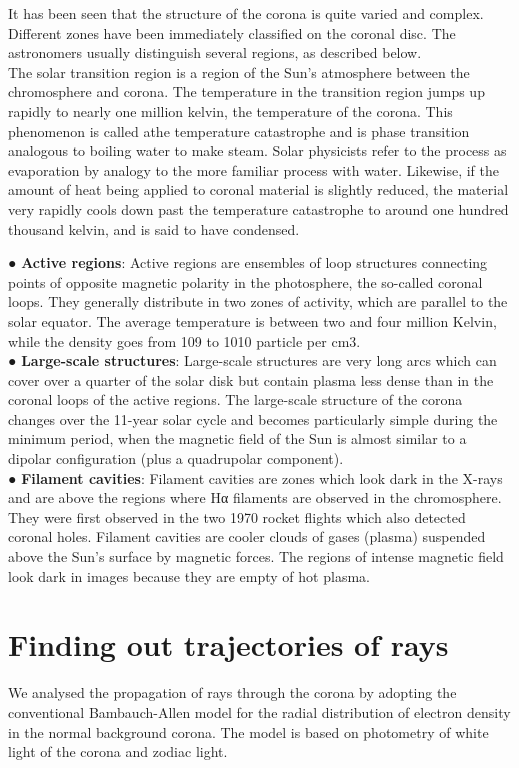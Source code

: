 \documentclass[journal]{IEEEtran}
\begin{document}
It has been seen that the structure of the corona is quite varied and complex. Different
zones have been immediately classified on the coronal disc. The astronomers usually
distinguish several regions, as described below.\\

The solar transition region is a region of the Sun's atmosphere between the chromosphere and corona. The temperature in the transition region jumps up rapidly to nearly one million kelvin, the temperature of the corona. This phenomenon is called athe temperature catastrophe and is phase transition analogous to boiling water to make steam. Solar physicists refer to the process as evaporation by analogy to the more familiar process with water. Likewise, if the amount of heat being applied to coronal material is slightly reduced, the material very rapidly cools down past the temperature catastrophe to around one hundred thousand kelvin, and is said to have condensed. 

● \textbf{Active regions}: ​Active regions are ensembles of loop structures connecting
points of opposite magnetic polarity in the photosphere, the so-called coronal
loops. They generally distribute in two zones of activity, which are parallel to the
solar equator. The average temperature is between two and four million Kelvin,
while the density goes from 109 to 1010 particle per cm3.\\
● \textbf{Large-scale structures}:​ Large-scale structures are very long arcs which can
cover over a quarter of the solar disk but contain plasma less dense than in the
coronal loops of the active regions. The large-scale structure of the corona
changes over the 11-year solar cycle and becomes particularly simple during the
minimum period, when the magnetic field of the Sun is almost similar to a dipolar
configuration (plus a quadrupolar component).\\
● \textbf{Filament cavities}:​ Filament cavities are zones which look dark in the X-rays and
are above the regions where Hα filaments are observed in the chromosphere.
They were first observed in the two 1970 rocket flights which also detected
coronal holes. Filament cavities are cooler clouds of gases (plasma) suspended
above the Sun's surface by magnetic forces. The regions of intense magnetic
field look dark in images because they are empty of hot plasma.\\

\section{Finding out trajectories of rays}
We analysed the propagation of rays through the corona by adopting  the conventional Bambauch-Allen model for the radial distribution of electron density in the normal background corona. The model is based on photometry of white light of the corona and zodiac light.
\end{document}
